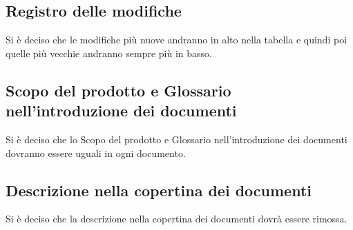 \subsection*{Registro delle modifiche}
Si è deciso che le modifiche più nuove andranno in alto nella tabella e quindi poi quelle più vecchie andranno sempre più in basso.

\subsection*{Scopo del prodotto e Glossario nell'introduzione dei documenti}
Si è deciso che lo Scopo del prodotto e Glossario nell'introduzione dei documenti dovranno essere uguali in ogni documento.

\subsection*{Descrizione nella copertina dei documenti}
Si è deciso che la descrizione nella copertina dei documenti dovrà essere rimossa.








